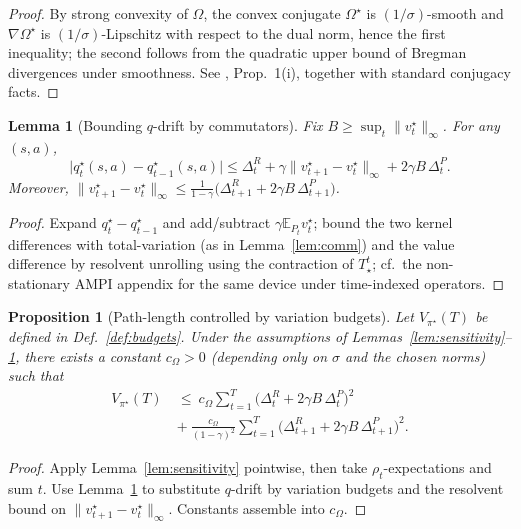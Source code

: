 \documentclass{article}
\theoremstyle{plain}
\newtheorem{proposition}[theorem]{Proposition}
\newtheorem{lemma}[theorem]{Lemma}
\theoremstyle{definition}
\theoremstyle{remark}
\newcommand{\E}{\mathbb{E}}
\newcommand{\1}{\mathbbm{1}}
\begin{document}
\begin{proof}
By strong convexity of $\Omega$, the convex conjugate $\Omega^\star$ is $(1/\sigma)$-smooth and
$\nabla\Omega^\star$ is $(1/\sigma)$-Lipschitz with respect to the dual norm, hence the first inequality;
the second follows from the quadratic upper bound of Bregman divergences under smoothness.  See
\citet{geist2019theory}, Prop.~1(i), together with standard conjugacy facts. 
\end{proof}

\begin{lemma}[Bounding $q$-drift by commutators]
\label{lem:q-drift}
Fix $B\!\ge\!\sup_t\|v_t^\star\|_\infty$. For any $(s,a)$,
\[
\big|q_t^\star(s,a)-q_{t-1}^\star(s,a)\big|
\le \Delta^R_t + \gamma\|v_{t+1}^\star-v_t^\star\|_\infty + 2\gamma B\,\Delta^P_t.
\]
Moreover, $\|v_{t+1}^\star-v_t^\star\|_\infty \le \frac{1}{1-\gamma}\big(\Delta^R_{t+1}+2\gamma B\,\Delta^P_{t+1}\big)$.
\end{lemma}

\begin{proof}
Expand $q^\star_t-q^\star_{t-1}$ and add/subtract $\gamma \E_{P_t}v^\star_t$; bound the two kernel
differences with total-variation (as in Lemma~\ref{lem:comm}) and the value difference by resolvent
unrolling using the contraction of $T^t_{\star}$; cf.\ the non-stationary AMPI appendix for the same
device under time-indexed operators.
\end{proof}

\begin{proposition}[Path-length controlled by variation budgets]
\label{prop:path-vs-variation}
Let $V_{\pi^\star}(T)$ be defined in Def.~\ref{def:budgets}. Under the assumptions of
Lemmas~\ref{lem:sensitivity}--\ref{lem:q-drift}, there exists a constant $c_\Omega>0$ (depending only on $\sigma$ and the chosen norms) such that
\begin{align}
V_{\pi^\star}(T)\ &\le\ c_\Omega\sum_{t=1}^{T}\Big(\Delta^R_t + 2\gamma B\,\Delta^P_t\Big)^2\\
 &+\ \frac{c_\Omega}{(1-\gamma)^2}\sum_{t=1}^{T}\Big(\Delta^R_{t+1}+2\gamma B\,\Delta^P_{t+1}\Big)^2.
\end{align}
\end{proposition}

\begin{proof}
Apply Lemma~\ref{lem:sensitivity} pointwise, then take $\rho_t$-expectations and sum $t$.
Use Lemma~\ref{lem:q-drift} to substitute $q$-drift by variation budgets and the resolvent bound on
$\|v_{t+1}^\star-v_t^\star\|_\infty$. Constants assemble into $c_\Omega$.
\end{proof}
\end{document}
